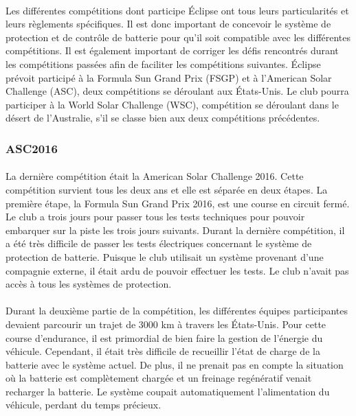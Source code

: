 	\paragraph{}
	Les différentes compétitions dont participe Éclipse ont tous leurs particularités et leurs règlements spécifiques. Il est donc important de concevoir le système de protection et de contrôle de batterie pour qu'il soit compatible avec les différentes compétitions. Il est également important de corriger les défis rencontrés durant les compétitions passées afin de faciliter les compétitions suivantes. Éclipse prévoit participé à la Formula Sun Grand Prix (FSGP) et à l'American Solar Challenge (ASC), deux compétitions se déroulant aux États-Unis. Le club pourra participer à la World Solar Challenge (WSC), compétition se déroulant dans le désert de l'Australie, s'il se classe bien aux deux compétitions précédentes.
	
	\subsubsection{ASC2016}
	
	\paragraph{}
	La dernière compétition était la American Solar Challenge 2016. Cette compétition survient tous les deux ans et elle est séparée en deux étapes. La première étape, la Formula Sun Grand Prix 2016, est une course en circuit fermé. Le club a trois jours pour passer tous les tests techniques pour pouvoir embarquer sur la piste les trois jours suivants. Durant la dernière compétition, il a été très difficile de passer les tests électriques concernant le système de protection de batterie. Puisque le club utilisait un système provenant d'une compagnie externe, il était ardu de pouvoir effectuer les tests. Le club n'avait pas accès à tous les systèmes de protection.
	
	\paragraph{}
	Durant la deuxième partie de la compétition, les différentes équipes participantes devaient parcourir un trajet de 3000 km à travers les États-Unis. Pour cette course d'endurance, il est primordial de bien faire la gestion de l'énergie du véhicule. Cependant, il était très difficile de recueillir l'état de charge de la batterie avec le système actuel. De plus, il ne prenait pas en compte la situation où la batterie est complètement chargée et un freinage regénératif venait recharger la batterie. Le système coupait automatiquement l'alimentation du véhicule, perdant du temps précieux.
	
